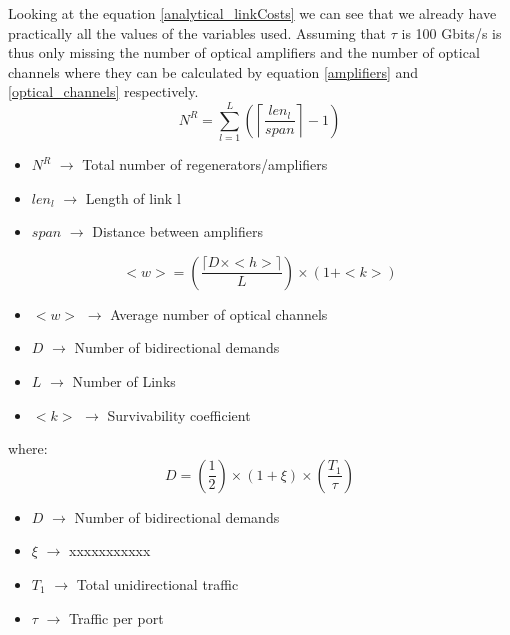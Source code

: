 Looking at the equation \ref{analytical_linkCosts} we can see that we already have practically all the values of the variables used. Assuming that $\tau$ is 100 Gbits/s is thus only missing the number of optical amplifiers and the number of optical channels where they can be calculated by equation \ref{amplifiers} and \ref{optical_channels} respectively.\\

\begin{equation}
N^R = \sum\limits_{l=1}^L\left(\left\lceil\frac{len_l}{span}\right\rceil-1\right)
\label{amplifiers}
\end{equation}

\begin{itemize}
\item{$N^R$			$\rightarrow$ Total number of regenerators/amplifiers}
\item{$len_l$		$\rightarrow$ Length of link l}
\item{$span$		$\rightarrow$ Distance between amplifiers}	
\end{itemize}	

\begin{equation}
<w> = \left( \frac{\lceil D \times <h> \rceil}{L} \right) \times \left( 1 + <k>\right)
\label{optical_channels}
\end{equation}

\begin{itemize}
\item{$<w>$		$\rightarrow$ Average number of optical channels}
\item{$D$  		$\rightarrow$ Number of bidirectional demands}
\item{$L$		$\rightarrow$ Number of Links}	
\item{$<k>$		$\rightarrow$ Survivability coefficient}
\end{itemize}	

where:
\begin{equation}
D = \left(\frac{1}{2}\right) \times \left( 1 + \xi \right) \times \left(\frac{T_1}{\tau}\right)
\label{demands}
\end{equation}

\begin{itemize}
\item{$D$  		$\rightarrow$ Number of bidirectional demands}
\item{$\xi$		$\rightarrow$ xxxxxxxxxxx}
\item{$T_1$		$\rightarrow$ Total unidirectional traffic}	
\item{$\tau$	$\rightarrow$ Traffic per port}
\end{itemize}


